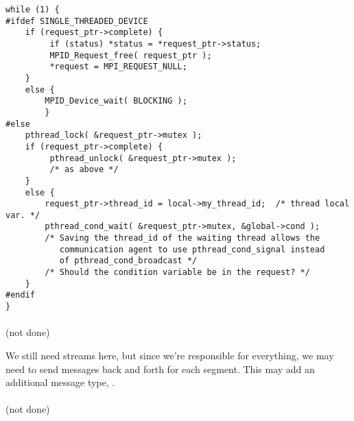 \begin{verbatim}
while (1) {
#ifdef SINGLE_THREADED_DEVICE
    if (request_ptr->complete) {
         if (status) *status = *request_ptr->status;
         MPID_Request_free( request_ptr );
         *request = MPI_REQUEST_NULL;
    }
    else {
        MPID_Device_wait( BLOCKING );
        }
#else
    pthread_lock( &request_ptr->mutex );
    if (request_ptr->complete) {
         pthread_unlock( &request_ptr->mutex );
         /* as above */
    }
    else {
        request_ptr->thread_id = local->my_thread_id;  /* thread local var. */
        pthread_cond_wait( &request_ptr->mutex, &global->cond );
        /* Saving the thread_id of the waiting thread allows the 
           communication agent to use pthread_cond_signal instead
           of pthread_cond_broadcast */
        /* Should the condition variable be in the request? */
    }
#endif
} 

\end{verbatim}

\paragraph{\shmemname}
(not done)

We still need streams here, but since we're responsible for
everything, we may need to send messages back and forth for each
segment.  This may add an additional message type,
.  

\paragraph{\vianame}
(not done)



